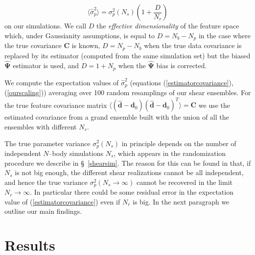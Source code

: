 \documentclass[reprint,aps,prd,superscriptaddress,showkeys,showpacs]{revtex4-1}
\newcommand{\bb}[1]{\mathbf{#1}}
\newcommand{\bbh}[1]{\mathbf{\hat{#1}}}
\newcommand{\h}[1]{\hat{#1}}
\begin{document}
\begin{equation}
\label{ourscaling}
\langle\h{\sigma}_p^2\rangle = \sigma^2_p(N_s)\left(1+\frac{D}{N_r}\right)
\end{equation}
%
on our simulations. We call $D$ the \textit{effective dimensionality} of the feature space which, under Gaussianity assumptions, is equal to $D=N_b-N_p$ in the case where the true covariance $\bb{C}$ is known, $D=N_p-N_b$ when the true data covariance is replaced by its estimator (computed from the same simulation set) but the biased $\bbh{\Psi}$ estimator is used, and $D=1+N_p$ when the $\bbh{\Psi}$ bias is corrected. 

We compute the expectation values of $\h{\sigma}^2_p$ (equations (\ref{estimatorcovariance}),(\ref{ourscaling})) averaging over 100 random resamplings of our shear ensembles. For the true feature covariance matrix $\langle(\bbh{d}-\bb{d}_0)(\bbh{d}-\bb{d}_0)^T\rangle=\bb{C}$ we use the estimated covariance from a grand ensemble built with the union of all the ensembles with different $N_s$. 

The true parameter variance $\sigma^2_p(N_s)$ in principle depends on the number of independent $N$--body simulations $N_s$, which appears in the randomization procedure we describe in \S~\ref{shearsim}. The reason for this can be found in that, if $N_s$ is not big enough, the different shear realizations cannot be all independent, and hence the true variance $\sigma^2_p(N_s\rightarrow\infty)$ cannot be recovered in the limit $N_r\rightarrow\infty$. In particular there could be some residual error in the expectation value of (\ref{estimatorcovariance}) even if $N_r$ is big. In the next paragraph we outline our main findings.
 


\section{Results} 
\end{document}

